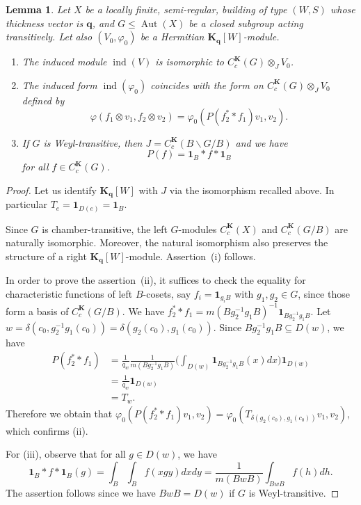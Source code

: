 \documentclass[12pt,a4paper]{amsproc}
\newtheorem{lemma}[theorem]{Lemma}
\theoremstyle{definition}
\DeclareMathOperator{\Aut}{Aut}
\DeclareMathOperator{\Ind}{ind}
\newcommand{\KK}{\mathbf K}
\newcommand{\one}{\mathbf 1}
\newcommand{\qq}{\mathbf q}
\begin{document}
\begin{lemma}\label{lem:induced-transitive-case}
Let   $X$ be a locally finite, semi-regular, building of type $(W, S)$ whose thickness vector is $\qq$, and $G \leq \Aut(X)$ be a closed subgroup acting transitively. Let also $(V_0, \varphi_0)$ be a   Hermitian $\KK_\qq[W]$-module. 
\begin{enumerate}[label=(\roman*)]
\item The induced module $\Ind(V)$ is isomorphic to $C_c^\KK(G) \otimes_J V_0$. 
\item The induced form $\Ind(\varphi_0)$ coincides with the form on  $C_c^\KK(G) \otimes_J V_0$ defined by 
$$\varphi(f_1 \otimes v_1, f_2 \otimes v_2) = \varphi_0(P(f_2^* * f_1)v_1, v_2).$$
\item If $G$ is Weyl-transitive, then $J = C^\KK_c(B\backslash G/B)$ and 
we have 
$$P(f) = \one_B * f * \one_B$$ 
for all $f \in C_c^\KK(G)$.  
\end{enumerate}
\end{lemma}
\begin{proof}
Let us identify $\KK_\qq[W]$ with $J$ via the isomorphism recalled above. In particular $T_e = \one_{D(e)} = \one_B$. 

Since $G$ is chamber-transitive, the left $G$-modules $C_c^\KK(X)$ and $C_c^\KK(G/B)$ are naturally isomorphic. Moreover, the natural isomorphism also preserves the structure of a right $\KK_\qq[W]$-module. Assertion~(i) follows. 

In order to prove the assertion~(ii),  it suffices to check the equality for characteristic functions of left $B$-cosets, say $f_i = \one_{g_iB}$ with $g_1, g_2 \in G$, since those form a basis of $C_c^\KK(G/B)$. We have $f_2^* * f_1 =m(Bg_2^{-1}g_1B)^{-1} \one_{Bg_2^{-1}g_1B}$. Let $w = \delta(c_0, g_2^{-1} g_1 (c_0)) = \delta(g_2(c_0), g_1(c_0))$. Since $Bg_2^{-1}g_1B \subseteq D(w)$, we  have
\begin{align*}
P(f_2^* * f_1) &= \frac 1 {q_w} \frac 1 {m(Bg_2^{-1}g_1B)} \big(\int_{D(w)} \one_{Bg_2^{-1}g_1B}(x) dx\big) \one_{D(w)}\\
&= \frac 1 {q_w} \one_{D(w)}\\
&= T_w.
\end{align*}
Therefore we obtain that $\varphi_0(P(f_2^* * f_1)v_1, v_2) = \varphi_0(T_{\delta(g_2(c_0), g_1(c_0))}v_1, v_2)$, which confirms (ii). 

For (iii), observe that for all $g \in D(w)$, we have 
$$\one_B * f * \one_B(g) = \int_B \int_B f(xgy)dx dy =\frac 1 {m(BwB)} \int_{BwB} f(h)dh.$$ 
The assertion follows since we have $BwB = D(w)$ if $G$ is Weyl-transitive. 
\end{proof}
	
\end{document}
